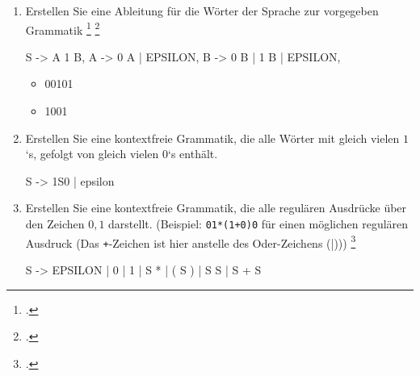 \documentclass{bschlangaul-aufgabe}
\begin{document}

\begin{enumerate}
\item Erstellen Sie eine Ableitung für die Wörter der Sprache zur
vorgegeben Grammatik
\footcite{theo:fs:2}
\footcite[Seite 10]{theo:fs:2}


\begin{bProduktionsRegeln}
S -> A 1 B,
A -> 0 A | EPSILON,
B -> 0 B | 1 B | EPSILON,
\end{bProduktionsRegeln}


\begin{itemize}
\item 00101

\begin{bAntwort}
\end{bAntwort}

\item 1001

\begin{bAntwort}
\end{bAntwort}
\end{itemize}

\item Erstellen Sie eine kontextfreie Grammatik, die alle Wörter mit
gleich vielen $1$‘s, gefolgt von gleich vielen $0$‘s enthält.

\begin{bAntwort}
\begin{bProduktionsRegeln}
S -> 1S0 | epsilon
\end{bProduktionsRegeln}
\end{bAntwort}

\item Erstellen Sie eine kontextfreie Grammatik, die alle regulären
Ausdrücke über den Zeichen $0,1$ darstellt. (Beispiel:
\texttt{01*(1+0)0} für einen möglichen regulären Ausdruck (Das
\texttt{+}-Zeichen ist hier anstelle des Oder-Zeichens (|)))
\footcite[Aufgabe 2a)]{theo:ab:5}

\begin{bAntwort}

\begin{bProduktionsRegeln}
S -> EPSILON | 0 | 1 | S * | ( S ) | S S | S + S
\end{bProduktionsRegeln}
\end{bAntwort}

\end{enumerate}
\end{document}
